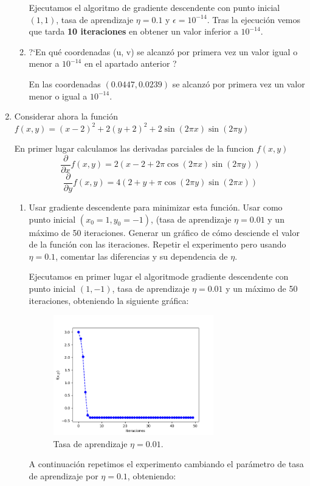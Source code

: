 \documentclass[size=a4, parskip=half, titlepage=false, toc=flat, toc=bib, 12pt]{scrartcl}
\begin{document}
\begin{enumerate}
\begin{enumerate}
Ejecutamos el algoritmo de gradiente descendente con punto inicial $(1,1)$, tasa de aprendizaje $\eta = 0.1$
y $\epsilon = 10^{-14}$. Tras la ejecución vemos que tarda \textbf{10 iteraciones} en obtener un valor inferior
a $10^{-14}$.

\item ?`En qué coordenadas (u, v) se alcanzó por primera vez un valor igual o menor a $10^{−14}$
en el apartado anterior ?

En las coordenadas $( 0.0447 ,  0.0239 )$ se alcanzó por primera vez un valor
menor o igual a $10^{-14}$.
\end{enumerate}

\item Considerar ahora la función $f(x,y) = (x-2)^2 + 2(y + 2)^2 + 2 \sin(2 \pi x) \sin(2 \pi y)$

En primer lugar calculamos las derivadas parciales de la funcion $f(x,y)$
$$\frac{\partial}{\partial x} f(x,y) =  2 (x - 2 + 2 \pi \cos(2 \pi x) \sin(2 \pi y))$$
$$\frac{\partial}{\partial y} f(x,y) = 4 (2 + y + \pi \cos(2 \pi y) \sin(2 \pi x))$$
\begin{enumerate}
\item Usar gradiente descendente para minimizar esta función. Usar como punto inicial
$(x_0 = 1, y_0 = −1)$, (tasa de aprendizaje $\eta = 0.01$ y un máximo de 50 iteraciones.
Generar un gráfico de cómo desciende el valor de la función con las iteraciones. Repetir
el experimento pero usando $\eta = 0.1$, comentar las diferencias y su dependencia de $\eta$.

Ejecutamos en primer lugar el algoritmode gradiente descendente con punto inicial $(1, -1)$, tasa
de aprendizaje $\eta = 0.01$ y un máximo de 50 iteraciones, obteniendo la siguiente gráfica:

\begin{figure}[H]
\centering
{}
\includegraphics[width=0.7\textwidth]{./img/lr001}
\caption{Tasa de aprendizaje $\eta = 0.01$.}
\end{figure}
A continuación repetimos el experimento cambiando el parámetro de tasa de aprendizaje por $\eta = 0.1$,
obteniendo:


\end{enumerate}
\end{enumerate}
\end{document}
